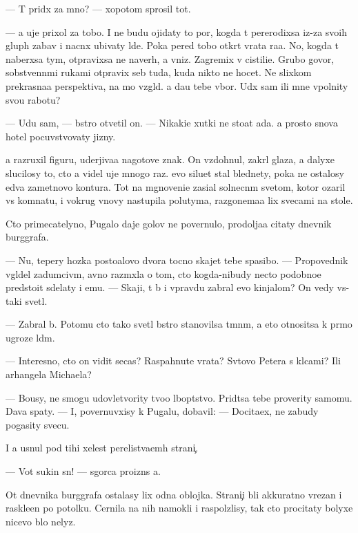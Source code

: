 \documentclass[10pt]{book}
\begin{document}
— T{\yi} prid{\e}x za mno{\y}? — xopotom sprosil tot.

— {\Y}a uje prixol za tobo{\y}. I ne budu ojidaty to{\y} por{\yi}, kogda t{\yi} pererodixsa iz-za svo{\y}ih glup{\yi}h zabav i nacn{\e}x ubivaty l{\iu}de{\y}. Poka pered tobo{\y} otkr{\yi}t{\yi} vrata ra{\y}a. No, kogda t{\yi} naber{\e}xsa tym{\yi}, otpravixsa ne naverh, a vniz. Zagremix v cistili{\x}e. Grubo govor{\ia}, sobstvenn{\yi}mi rukami otpravix seb{\ia} tuda, kuda nikto ne hocet. Ne slixkom prekrasna{\y}a perspektiva, na mo{\y} vzgl{\ia}d. {\Y}a da{\y}u tebe v{\yi}bor. U{\y}d{\e}x sam ili mne v{\yi}polnity svo{\y}u rabotu?

— U{\y}du sam, — b{\yi}stro otvetil on. — Nikaki{\y}e xutki ne sto{\y}at ada. {\Y}a prosto snova hotel pocuvstvovaty jizny.

{\Y}a razruxil figuru, uderjiva{\y}a nagotove znak. On vzdohnul, zakr{\yi}l glaza, a dalyxe slucilosy to, cto {\y}a videl uje mnogo raz. {\Y}evo siluet stal blednety, poka ne ostalosy {\y}edva zametnovo kontura. Tot na mgnoveni{\y}e zasi{\y}al solnecn{\yi}m svetom, kotor{\yi}{\y} ozaril vs{\iu} komnatu, i vokrug vnovy nastupila polutyma, razgon{\ia}{\y}ema{\y}a lix svecami na stole.

Cto primecatelyno, Pugalo daje golov{\yi} ne povernulo, prodolja{\y}a citaty dnevnik burggrafa.

— Nu, tepery hoz{\ia}{\y}ka posto{\y}alovo dvora tocno skajet tebe spasibo. — Propovednik v{\yi}gl{\ia}del zadumciv{\yi}m, {\y}avno razm{\yi}xl{\ia}{\y}a o tom, cto kogda-nibudy necto podobno{\y}e predsto{\y}it sdelaty i {\y}emu. — Skaji, t{\yi} b{\yi} i vpravdu zabral {\y}evo kinjalom? On vedy vs{\e}-taki svetl{\yi}{\y}.

— Zabral b{\yi}. Potomu cto tako{\y} svetl{\yi}{\y} b{\yi}stro stanovilsa t{\e}mn{\yi}m, a eto otnositsa k pr{\ia}mo{\y} ugroze l{\iu}d{\ia}m.

— Interesno, cto on vidit se{\y}cas? Raspahnut{\yi}{\y}e vrata? Sv{\ia}tovo Petera s kl{\iu}cami? Ili arhangela Michaela?

— Bo{\y}usy, ne smogu udovletvority tvo{\y}o l{\iu}bop{\yi}tstvo. Prid{\e}tsa tebe proverity samomu. Dava{\y} spaty. — I, povernuvxisy k Pugalu, dobavil: — Docita{\y}ex, ne zabudy pogasity svecu.

I {\y}a usnul pod tihi{\y} xelest perelist{\yi}va{\y}em{\yi}h strani{\c}.

— Vot sukin s{\yi}n! — sgor{\ia}ca proizn{\e}s {\y}a.

Ot dnevnika burggrafa ostalasy lix odna oblojka. Strani{\c}i b{\yi}li akkuratno v{\yi}rezan{\yi} i raskle{\y}en{\yi} po potolku. Cernila na nih namokli i raspolzlisy, tak cto procitaty bolyxe nicevo b{\yi}lo nelyz{\ia}.
\end{document}
